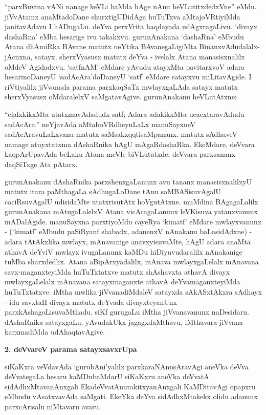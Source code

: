 ``parxBuvina vANi nanage keVLi baMda hAge nAnu heVLutitxdedxVne'' eMdu. jiVvAtamx anaMtadoDane shurxtigUDidAga huTuTxva aMtajoVRtiyiMda janitavAdavu I hADugaLu. deYva perxVrita haqdayada udAgxragaLivu. `divayx dashaRna' eMba hesarige ivu takakxvu. gurunAnakana `dashaRna' eMbudu Atana dhAmiRka BAvane matutx neYtika BAvanegaLigiMta BinanxvAdudalalx-jAcnxna, satayx, sherxVyasusx matutx deYva - ivelalx Atana manasisxnalilx oMdeV Agidadxvu. `satfnAM' eMdare yAvudu atayxMta pavitarxvoV adara hesarinoDaneyU `sadAcAra'doDaneyU `satf' eMdare satayxvu miLitavAgide. I riVtiyalilx jiVvanada parama parxkaqSaTx mwlayxgaLAda satayx matutx sherxVyasusx oMdaralelxV saMgatavAgive. gurunAnakanu heVLutAtxne:

``elalxkikxMta utatxmavAdadudx satf; Adara adakikxMta ucacxtaravAdudu sadAcAra.'' neYjavAda aMtaboVRdheyuLaLx manuSayxneV sadAcAravuLaLxvanu matutx saMsakxqqtisaMpananx. matutx sAdhuveV namage atuyxtatxma dAshaRnika hAgU mAgaRdashaRka. EkeMdare, deVvara kaqpArUpavAda beLaku Atana meVle biVLutatxde; deVvara parxsananx daqSiTxge Ata pAtarx.

gurunAnakanu dAshaRnika parxshenxgaLanunx avu tananx manasisxnalilxyU matutx itara paMthagaLa sAdhugaLoDane tAnu saMBASisuvAgalU caciRsuvAgalU udisidaMte utatxrisutAtx hoVgutAtxne. muMdina BAgagaLalilx gurunAnakana mAtugaLalelxV Atana vicAragaLanunx leVKisuva yatanxvanunx mADalAgide. manuSayxna parxtiyoMdu cayeRya `kimatf' eMdare mwlayxvanunx - (`kimatf' eMbudu paSiRyanf shabadx, adanenxV nAnakanu baLasidAdxne) - adara tAtAkxlika mwlayx, mAnavanige anavxyisuvaMte, hAgU adara anaMta athavA deYviV mwlayx ivugaLanunx kaMDu hiDiyuvudaralilx nAnakanige tuMba sharxdedhx. Atana aBipArxyadalilx, mAnava mwlayxgaLelalx mAnavana savx-maganxteyiMda huTuTxtatxve matutx shAshavxta athavA divayx mwlayxgaLelalx mAnavana satayxmaganxte athavA deYvamaganxteyiMda huTuTxtatxve. iMtha mwlika jiVvanadiMdaleV satayxda sAkASxtAkxra sAdhayx - idu savxtaH divayx matutx deYvada divayxteyanUnx parxkAshagoLisuvaMthadu. siKf gurugaLu iMtha jiVvanavanunx naDesidaru. dAshaRnika satayxgaLu, yAvudakUkx jagagxdaMthavu, iMthavara jiVvana karxmadiMda udAhaqtavAgive.

\bigskip
\begin{center}
{\Large\bf 2. deVvareV parama satayxsavxrUpa}
\end{center}

siKaKxra veVdavAda `gurubAni'yalilx parxkaraNAnusAravAgi aneVka deVva deVvate\-gaLa hesaru kaMDubaMdarU siKaKxru aneVka deVvatA sidAdhxMtavanAnxgali EkadeVvatAnu\-rakitxyanAnxgali KaMDitavAgi opapxru eMbudu vAsatxvavAda saMgati. EkeYka deYva sidAdhxMtakekx olidu adanunx parxcArisalu niMtavaru avaru.

